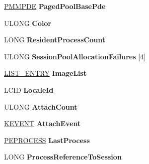 \begin{DoxyCompactItemize}
\hyperlink{struct___m_m_p_t_e}{P\+M\+M\+P\+DE} {\bfseries Paged\+Pool\+Base\+Pde}
\item 
\mbox{\label{struct___m_m___s_e_s_s_i_o_n___s_p_a_c_e_a1ee336368e3161ea61239bc56c0a720c}} 
U\+L\+O\+NG {\bfseries Color}
\item 
\mbox{\label{struct___m_m___s_e_s_s_i_o_n___s_p_a_c_e_a2cf2afb45427da04c5abc1dd569bd08e}} 
L\+O\+NG {\bfseries Resident\+Process\+Count}
\item 
\mbox{\label{struct___m_m___s_e_s_s_i_o_n___s_p_a_c_e_a4373bd4344ff22e1abf3e376a166b81c}} 
U\+L\+O\+NG {\bfseries Session\+Pool\+Allocation\+Failures} \mbox{[}4\mbox{]}
\item 
\mbox{\label{struct___m_m___s_e_s_s_i_o_n___s_p_a_c_e_af9d48fe5eb66494a419ebd54ad798a2d}} 
\hyperlink{struct___l_i_s_t___e_n_t_r_y}{L\+I\+S\+T\+\_\+\+E\+N\+T\+RY} {\bfseries Image\+List}
\item 
\mbox{\label{struct___m_m___s_e_s_s_i_o_n___s_p_a_c_e_a4a61e5df95db6143eb0e1314b31ea182}} 
L\+C\+ID {\bfseries Locale\+Id}
\item 
\mbox{\label{struct___m_m___s_e_s_s_i_o_n___s_p_a_c_e_a8ec0c74298e674e7aa84b99e8e276e52}} 
U\+L\+O\+NG {\bfseries Attach\+Count}
\item 
\mbox{\label{struct___m_m___s_e_s_s_i_o_n___s_p_a_c_e_a91c8af737d626c1f1861bfda0ad0d0be}} 
\hyperlink{struct___k_e_v_e_n_t}{K\+E\+V\+E\+NT} {\bfseries Attach\+Event}
\item 
\mbox{\label{struct___m_m___s_e_s_s_i_o_n___s_p_a_c_e_add290864a051980830c9456fde321c92}} 
\hyperlink{struct___e_p_r_o_c_e_s_s}{P\+E\+P\+R\+O\+C\+E\+SS} {\bfseries Last\+Process}
\item 
\mbox{\label{struct___m_m___s_e_s_s_i_o_n___s_p_a_c_e_a7e705556c7ee6417b8a2ab590d51d884}} 
L\+O\+NG {\bfseries Process\+Reference\+To\+Session}

\end{DoxyCompactItemize}
